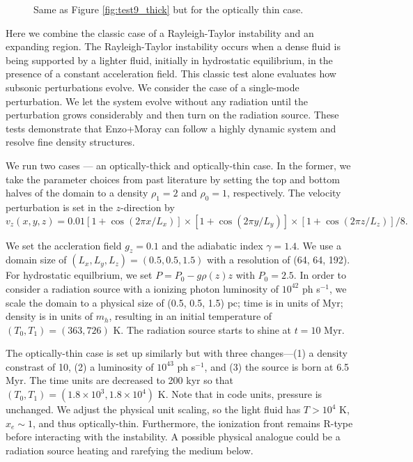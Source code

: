 \documentclass[12pt,preprint]{aastex}
\begin{document}
\begin{figure}[t]
  \caption{\label{fig:test9_thin} Same as Figure \ref{fig:test9_thick}
    but for the optically thin case.}
\end{figure}

Here we combine the classic case of a Rayleigh-Taylor instability and
an expanding  region.  The Rayleigh-Taylor instability
occurs when a dense fluid is being supported by a lighter fluid,
initially in hydrostatic equilibrium, in the presence of a constant
acceleration field.  This classic test alone evaluates how subsonic
perturbations evolve.  We consider the case of a single-mode
perturbation.  We let the system evolve without any radiation until
the perturbation grows considerably and then turn on the radiation
source.  These tests demonstrate that Enzo+Moray can follow a highly
dynamic system and resolve fine density structures.

We run two cases --- an optically-thick and optically-thin case.  In
the former, we take the parameter choices from past literature
\citep[e.g.][]{Liska03, Stone08} by setting the top and bottom halves
of the domain to a density $\rho_1 = 2$ and $\rho_0 = 1$,
respectively.  The velocity perturbation is set in the $z$-direction
by
\begin{equation}
  v_z(x,y,z) = 0.01 [1 + \cos(2\pi x / L_x)] \times 
  [1 + \cos(2\pi y / L_y)] \times [1 + \cos(2\pi z / L_z)]/8.
\end{equation}

We set the accleration field $g_z = 0.1$ and the adiabatic index
$\gamma = 1.4$.  We use a domain size of $(L_x, L_y, L_z) = (0.5, 0.5,
1.5)$ with a resolution of (64, 64, 192).  For hydrostatic equilbrium,
we set $P = P_0 - g \rho(z) z$ with $P_0 = 2.5$.  In order to consider
a radiation source with a ionizing photon luminosity of $10^{42}$ ph
s$^{-1}$, we scale the domain to a physical size of (0.5, 0.5, 1.5)
pc; time is in units of Myr; density is in units of $m_h$, resulting
in an initial temperature of $(T_0, T_1) = (363, 726)$ K.  The
radiation source starts to shine at $t = 10$ Myr.

The optically-thin case is set up similarly but with three
changes---(1) a density constrast of 10, (2) a luminosity of $10^{43}$
ph s$^{-1}$, and (3) the source is born at 6.5 Myr.  The time units
are decreased to 200 kyr so that $(T_0, T_1) = (1.8 \times 10^3, 1.8
\times 10^4)$ K.  Note that in code units, pressure is unchanged.  We
adjust the physical unit scaling, so the light fluid has $T > 10^4$ K,
$x_e \sim 1$, and thus optically-thin.  Furthermore, the ionization
front remains R-type before interacting with the instability.  A
possible physical analogue could be a radiation source heating and
rarefying the medium below.
\end{document}
